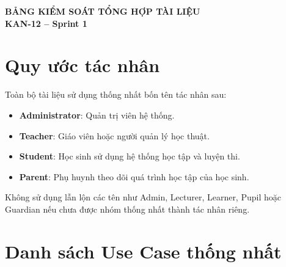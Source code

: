 \documentclass[12pt,a4paper]{article}
\begin{document}
	
	\begin{center}
		{\Large\textbf{BẢNG KIỂM SOÁT TỔNG HỢP TÀI LIỆU}}\\[0.3cm]
		{\large\textbf{KAN-12 -- Sprint 1}}
	\end{center}
	
	\section{Quy ước tác nhân}
	
	Toàn bộ tài liệu sử dụng thống nhất bốn tên tác nhân sau:
	
	\begin{itemize}
		\item \textbf{Administrator}: Quản trị viên hệ thống.
		\item \textbf{Teacher}: Giáo viên hoặc người quản lý học thuật.
		\item \textbf{Student}: Học sinh sử dụng hệ thống học tập và luyện thi.
		\item \textbf{Parent}: Phụ huynh theo dõi quá trình học tập của học sinh.
	\end{itemize}
	
	Không sử dụng lẫn lộn các tên như Admin, Lecturer, Learner, Pupil
	hoặc Guardian nếu chưa được nhóm thống nhất thành tác nhân riêng.
	
	\section{Danh sách Use Case thống nhất}
	
\end{document}
